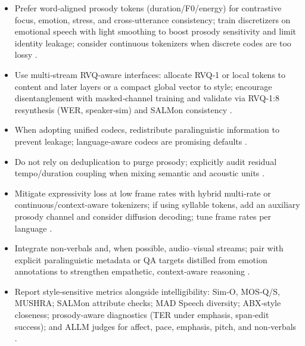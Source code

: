 \documentclass{article}
\begin{document}
\begin{itemize}
\item Prefer word‑aligned prosody tokens (duration/F0/energy) for contrastive focus, emotion, stress, and cross‑utterance consistency; train discretizers on emotional speech with light smoothing to boost prosody sensitivity and limit identity leakage; consider continuous tokenizers when discrete codes are too lossy \cite{qian2025prosodylmuncoveringemergingprosodyproces,onda2025benchmarkingprosodyencodingdiscretespeec,li2025continuousspeechtokenizertext}.
\item Use multi‑stream RVQ‑aware interfaces: allocate RVQ‑1 or local tokens to content and later layers or a compact global vector to style; encourage disentanglement with masked‑channel training and validate via RVQ‑1:8 resynthesis (WER, speaker‑sim) and SALMon consistency \cite{ji2025languagecodecbridgingdiscreterepresentat,maimon2025salmonsuiteacousticlanguagemodelevaluati,entry2025indicsuperbspeechprocessinguniversalperf}.
\item When adopting unified codecs, redistribute paralinguistic information to prevent leakage; language‑aware codecs are promising defaults \cite{ji2025languagecodecbridgingdiscreterepresentat}.
\item Do not rely on deduplication to purge prosody; explicitly audit residual tempo/duration coupling when mixing semantic and acoustic units \cite{peng2024empiricalstudyspeechlanguagemodelsprompt}.
\item Mitigate expressivity loss at low frame rates with hybrid multi‑rate or continuous/context‑aware tokenizers; if using syllable tokens, add an auxiliary prosody channel and consider diffusion decoding; tune frame rates per language \cite{li2025continuousspeechtokenizertext,qian2025prosodylmuncoveringemergingprosodyproces,zhang2025impactframeratesspeechtokenizercasestudy,yang2025almtokenizerlowbitratesemanticrichaudioc,yang2025diffsoundstreamefficientspeechtokenizati}.
\item Integrate non‑verbals and, when possible, audio–visual streams; pair with explicit paralinguistic metadata or QA targets distilled from emotion annotations to strengthen empathetic, context‑aware reasoning \cite{har-tuv2025pastphoneticacousticspeechtokenizer,wang2025bossbeyondsemanticspeech,wang2025incorporatingcontextualparalinguisticund,mousavi2024howshouldweextractdiscreteaudiotokenssel}.
\item Report style‑sensitive metrics alongside intelligibility: Sim‑O, MOS‑Q/S, MUSHRA; SALMon attribute checks; MAD Speech diversity; ABX‑style closeness; prosody‑aware diagnostics (TER under emphasis, span‑edit success); and ALLM judges for affect, pace, emphasis, pitch, and non‑verbals \cite{maimon2025salmonsuiteacousticlanguagemodelevaluati,futeral2025madspeechmeasuresacousticdiversity,fily2024establishingdegreesclosenessbetweenaudio,chiang2025audioawarelargelanguagemodelsasjudgesspe}.
\end{itemize}
\end{document}
